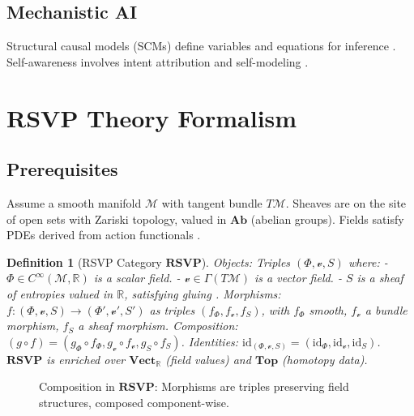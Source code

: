 \documentclass{article}
\newtheorem{definition}{Definition}
\begin{document}
\subsection{Mechanistic AI}
Structural causal models (SCMs) define variables and equations for inference \cite{Pearl2009}. Self-awareness involves intent attribution and self-modeling \cite{Bennett2025, Goguen1992}.

\section{RSVP Theory Formalism}

\subsection{Prerequisites}
Assume a smooth manifold $\mathcal{M}$ with tangent bundle $T\mathcal{M}$. Sheaves are on the site of open sets with Zariski topology, valued in $\mathbf{Ab}$ (abelian groups). Fields satisfy PDEs derived from action functionals \cite{Kock2004}.

\begin{definition}[RSVP Category $\mathbf{RSVP}$]
Objects: Triples $(\Phi, \mathcal{v}, S)$ where:
- $\Phi \in C^\infty(\mathcal{M}, \mathbb{R})$ is a scalar field.
- $\mathcal{v} \in \Gamma(T\mathcal{M})$ is a vector field.
- $S$ is a sheaf of entropies valued in $\mathbb{R}$, satisfying gluing \cite{MacLane1992}.
Morphisms: $f: (\Phi, \mathcal{v}, S) \to (\Phi', \mathcal{v}', S')$ as triples $(f_\Phi, f_\mathcal{v}, f_S)$, with $f_\Phi$ smooth, $f_\mathcal{v}$ a bundle morphism, $f_S$ a sheaf morphism. Composition: $(g \circ f) = (g_\Phi \circ f_\Phi, g_\mathcal{v} \circ f_\mathcal{v}, g_S \circ f_S)$. Identities: $\text{id}_{(\Phi, \mathcal{v}, S)} = (\text{id}_\Phi, \text{id}_\mathcal{v}, \text{id}_S)$. $\mathbf{RSVP}$ is enriched over $\mathbf{Vect}_\mathbb{R}$ (field values) and $\mathbf{Top}$ (homotopy data).
\end{definition}

\begin{figure}[h]
\centering
{}
\caption{Composition in $\mathbf{RSVP}$: Morphisms are triples preserving field structures, composed component-wise.}
\label{fig:rsvp_composition}
\end{figure}
\end{document}
